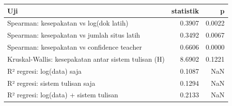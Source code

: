 \begin{tabular}{lrr}
\toprule
Uji & statistik & p \\
\midrule
Spearman: kesepakatan vs log(dok latih) & 0.3907 & 0.0022 \\
Spearman: kesepakatan vs jumlah situs latih & 0.3492 & 0.0067 \\
Spearman: kesepakatan vs confidence teacher & 0.6606 & 0.0000 \\
Kruskal-Wallis: kesepakatan antar sistem tulisan (H) & 8.6902 & 0.1221 \\
R² regresi: log(data) saja & 0.1087 & NaN \\
R² regresi: sistem tulisan saja & 0.1294 & NaN \\
R² regresi: log(data) + sistem tulisan & 0.2133 & NaN \\
\bottomrule
\end{tabular}
